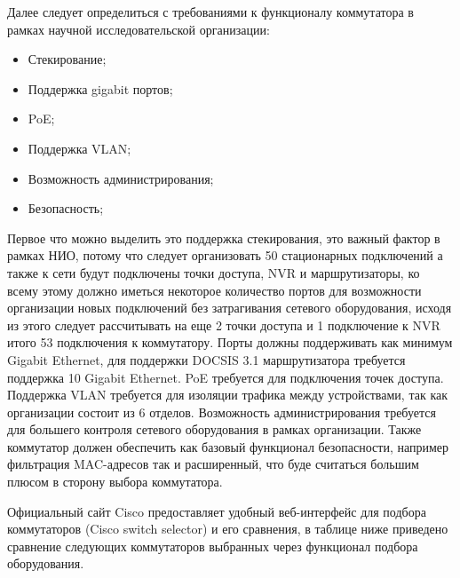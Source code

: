 Далее следует определиться с требованиями к функционалу коммутатора 
в рамках научной исследовательской организации:

\begin{itemize}
    \item Стекирование;
    \item Поддержка gigabit портов;
    \item PoE;    
    \item Поддержка VLAN;    
    \item Возможность администрирования;    
    \item Безопасность;
\end{itemize}

Первое что можно выделить это поддержка стекирования, это важный фактор в рамках НИО, потому что следует организовать 50 стационарных подключений
а также к сети будут подключены точки доступа, NVR и маршрутизаторы, ко всему этому должно иметься некоторое количество портов для возможности
организации новых подключений без затрагивания сетевого оборудования, исходя из этого следует рассчитывать на еще 2 точки доступа и 1 подключение к NVR итого 53 подключения к коммутатору.
Порты должны поддерживать как минимум Gigabit Ethernet, для поддержки DOCSIS 3.1 маршрутизатора требуется поддержка 10 Gigabit Ethernet. PoE требуется для подключения точек доступа. 
Поддержка VLAN требуется для изоляции трафика между устройствами, так как организации состоит из 6 отделов.
Возможность администрирования требуется для большего контроля сетевого оборудования в рамках организации.
Также коммутатор должен обеспечить как базовый функционал безопасности, например фильтрация MAC-адресов так и расширенный, что буде считаться большим плюсом в сторону
выбора коммутатора.

Официальный сайт Cisco предоставляет удобный веб-интерфейс для подбора коммутаторов (Cisco switch selector) и его сравнения, в таблице ниже приведено сравнение следующих коммутаторов 
выбранных через функционал подбора оборудования.

